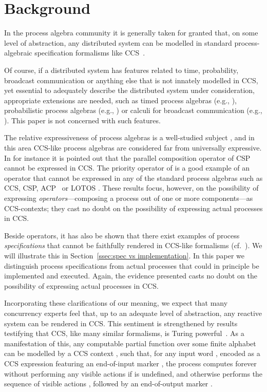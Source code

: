 \documentclass[smallcondensed]{svjour3}
\makeatletter
\newcommand{\SSect}[1]{Section~\ref{ssec:#1}}
\newcounter {part}
\renewcommand\thepart{\@Roman\c@part}
\def\part#1#2{\vspace{6ex}
\noindent {\Large\bf\boldmath Part \refstepcounter{part}\thepart\ \ \ #1\label{part:#2}}

\vspace{-3.5ex}
}
\makeatother
\begin{document}
\part{Motivation \& Discussion}{one}
\section{Background}

In the process algebra community it is
generally taken for granted
that, on some level of abstraction, any distributed system can be
modelled in standard process-algebraic specification formalisms like CCS~\cite{Mi89}.

Of course, if a distributed system has features related to time, probability, broadcast communication
or anything else that is not innately modelled in CCS, yet essential to adequately describe the
distributed system under consideration, appropriate extensions are needed,
such as timed process algebras (e.g., \cite{ReedRoscoe86,HennessyRegan95,BB96,LV01,CVJ02}),
probabilistic process algebras (e.g., \cite{HJ90})
or calculi for broadcast communication (e.g., \cite{CBS}).
This paper is not concerned with such features.

The relative expressiveness of process algebras is a well-studied subject \cite{Va93,Parrow08,Gorla10a},
 and in this area CCS-like process algebras are considered far from universally expressive.
In \cite{vG12} for instance it is pointed out that the parallel composition operator of CSP \cite{BHR84,Ho85} cannot
be expressed in CCS\@.
The priority operator of \cite{BBK87b}
is a good example of an
operator that cannot be expressed in any of the standard process algebras such as CCS, CSP, ACP~\cite{BK86} or LOTOS \cite{BB87}.
These results focus, however, on the possibility of expressing \emph{operators}---composing a process out of
one or more components---as CCS-contexts; they cast no doubt on the possibility of expressing actual
processes in CCS\@.

Beside operators, it has also be shown that there exist examples of process \emph{specifications} that cannot be faithfully rendered in
CCS-like formalisms (cf.~\cite{vG05d}). We will illustrate this in \SSect{spec vs implementation}. In
this paper we distinguish process specifications from actual processes that could in principle be implemented and executed.
Again, the evidence presented casts no doubt on the possibility of expressing actual processes in CCS\@.


Incorporating these clarifications of our meaning, we expect that many concurrency experts feel that,
up to an adequate level of abstraction, any reactive system can be rendered in CCS\@.
This sentiment is strengthened by results testifying that CCS,
like many similar formalisms, is Turing powerful~\cite{Mi89}.
As a manifestation of this, any computable partial function  over some
finite alphabet  can be modelled by a CCS context , such that,
for any input word , encoded as a CCS expression
 featuring an end-of-input marker , the process  computes
forever without performing any visible actions if  is undefined, and otherwise performs the
sequence of visible actions , followed by an end-of-output marker .
\end{document}
